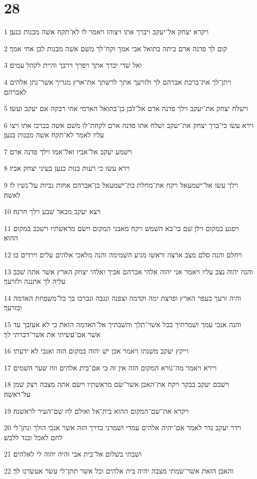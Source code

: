 \chapter{28}

\par 1 ויקרא יצחק אל־יעקב ויברך אתו ויצוהו ויאמר לו לא־תקח אשׁה מבנות כנען׃
\par 2 קום לך פדנה ארם ביתה בתואל אבי אמך וקח־לך משׁם אשׁה מבנות לבן אחי אמך׃
\par 3 ואל שׁדי יברך אתך ויפרך וירבך והיית לקהל עמים׃
\par 4 ויתן־לך את־ברכת אברהם לך ולזרעך אתך לרשׁתך את־ארץ מגריך אשׁר־נתן אלהים לאברהם׃
\par 5 וישׁלח יצחק את־יעקב וילך פדנה ארם אל־לבן בן־בתואל הארמי אחי רבקה אם יעקב ועשׂו׃
\par 6 וירא עשׂו כי־ברך יצחק את־יעקב ושׁלח אתו פדנה ארם לקחת־לו משׁם אשׁה בברכו אתו ויצו עליו לאמר לא־תקח אשׁה מבנות כנען׃
\par 7 וישׁמע יעקב אל־אביו ואל־אמו וילך פדנה ארם׃
\par 8 וירא עשׂו כי רעות בנות כנען בעיני יצחק אביו׃
\par 9 וילך עשׂו אל־ישׁמעאל ויקח את־מחלת בת־ישׁמעאל בן־אברהם אחות נביות על־נשׁיו לו לאשׁה׃
\par 10 ויצא יעקב מבאר שׁבע וילך חרנה׃
\par 11 ויפגע במקום וילן שׁם כי־בא השׁמשׁ ויקח מאבני המקום וישׂם מראשׁתיו וישׁכב במקום ההוא׃
\par 12 ויחלם והנה סלם מצב ארצה וראשׁו מגיע השׁמימה והנה מלאכי אלהים עלים וירדים בו׃
\par 13 והנה יהוה נצב עליו ויאמר אני יהוה אלהי אברהם אביך ואלהי יצחק הארץ אשׁר אתה שׁכב עליה לך אתננה ולזרעך׃
\par 14 והיה זרעך כעפר הארץ ופרצת ימה וקדמה וצפנה ונגבה ונברכו בך כל־משׁפחת האדמה ובזרעך׃
\par 15 והנה אנכי עמך ושׁמרתיך בכל אשׁר־תלך והשׁבתיך אל־האדמה הזאת כי לא אעזבך עד אשׁר אם־עשׂיתי את אשׁר־דברתי לך׃
\par 16 וייקץ יעקב משׁנתו ויאמר אכן ישׁ יהוה במקום הזה ואנכי לא ידעתי׃
\par 17 ויירא ויאמר מה־נורא המקום הזה אין זה כי אם־בית אלהים וזה שׁער השׁמים׃
\par 18 וישׁכם יעקב בבקר ויקח את־האבן אשׁר־שׂם מראשׁתיו וישׂם אתה מצבה ויצק שׁמן על־ראשׁה׃
\par 19 ויקרא את־שׁם־המקום ההוא בית־אל ואולם לוז שׁם־העיר לראשׁנה׃
\par 20 וידר יעקב נדר לאמר אם־יהיה אלהים עמדי ושׁמרני בדרך הזה אשׁר אנכי הולך ונתן־לי לחם לאכל ובגד ללבשׁ׃
\par 21 ושׁבתי בשׁלום אל־בית אבי והיה יהוה לי לאלהים׃
\par 22 והאבן הזאת אשׁר־שׂמתי מצבה יהיה בית אלהים וכל אשׁר תתן־לי עשׂר אעשׂרנו לך׃

